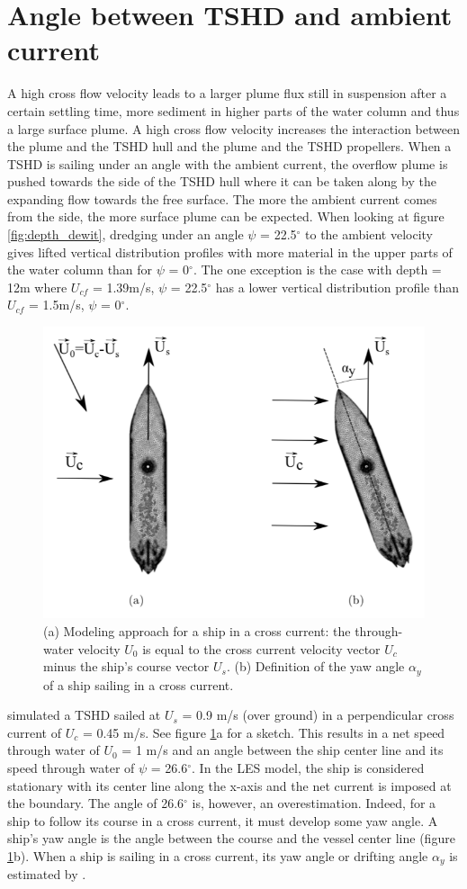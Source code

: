 \section{Angle between TSHD and ambient current}

A high cross flow velocity leads to a larger plume flux still in suspension after a certain settling time, more sediment in higher parts of the water column and thus a large surface plume. A high cross flow velocity increases the interaction between the plume and the TSHD hull and the plume and the TSHD propellers. When a TSHD is sailing under an angle with the ambient current, the overflow plume is pushed towards the side of the TSHD hull where it can be taken along by the expanding flow towards the free surface. The more the ambient current comes from the side, the more surface plume can be expected\citep{Dewit}. When looking at figure \ref{fig:depth_dewit}, dredging under an angle $\psi$ =  22.5$^\circ$ to the ambient velocity gives lifted vertical distribution profiles with more material in the upper parts of the water column than for $\psi$ =  0$^\circ$. The one exception is the case with depth =  12m where $U_{cf}$ =  1.39m/s, $\psi$ =  22.5$^\circ$ has a lower vertical distribution profile than $U_{cf}$ = 1.5m/s, $\psi$ = 0$^\circ$.

\begin{figure}[ht!]
    \centering
    \includegraphics[width = .6\linewidth]{Images/Anlge_TSHD.png}
    \caption{(a) Modeling approach for a ship in a cross current: the through-water velocity $U_0$ is equal to the cross current velocity vector $U_c$ minus the ship’s course vector $U_s$. (b) Definition of the yaw angle $\alpha_y$ of a ship sailing in a cross current.
}
    \label{fig:Angle_TSHD}
\end{figure}


\noindent \cite{Decrop} simulated a TSHD sailed at $U_s$ = 0.9 m/s (over ground) in a perpendicular cross current of $U_c$ = 0.45 m/s. See figure \ref{fig:Angle_TSHD}a for a sketch. This results in a net speed through water of $U_{0}$ = 1 m/s and an angle between the ship center line and its speed through water of $\psi$ = 26.6$^\circ$. In the LES model, the ship is considered stationary with its center line along the x-axis and the net current is imposed at the boundary. The angle of 26.6$^\circ$ is, however, an overestimation. Indeed, for a ship to follow its course in a cross current, it must develop some yaw angle. A ship’s yaw angle is the angle between the course and the vessel center line (figure \ref{fig:Angle_TSHD}b). When a ship is sailing in a cross current, its yaw angle or drifting angle $\alpha_y$ is estimated by \cite{Pianc}.

